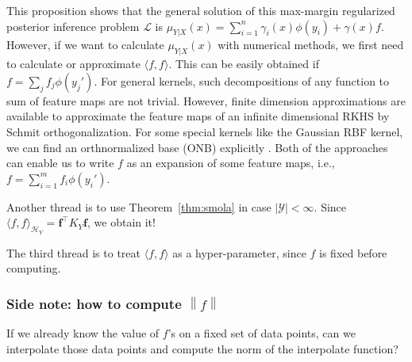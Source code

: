 \documentclass[a4paper]{article}
\renewcommand{\bf}{\mathbf}
\renewcommand{\cal}{\mathcal}
\newcommand{\norm}[1]{\left\lVert#1\right\rVert}
\newcommand{\T}{\intercal}
\newcommand{\thmref}[1]{Theorem~\ref{#1}}
\begin{document}
This proposition shows that the general solution of this max-margin regularized posterior inference problem $\cal{L}$ is $\mu_{Y|X}(x) = \sum_{i=1}^n \gamma_i(x) \phi(y_i) + \gamma(x) f$. However, if we want to calculate $\mu_{Y|X}(x)$ with numerical methods, we first need to calculate or approximate $\langle f,f \rangle$. This can be easily obtained if $f = \sum_j f_j\phi(y_j')$. For general kernels, such decompositions of any function to sum of feature maps are not trivial. However, finite dimension approximations \cite{rahimi2007random}\cite{oliva2015bayesian} are available to approximate the feature maps of an infinite dimensional RKHS by Schmit orthogonalization. For some special kernels like the Gaussian RBF kernel, we can find an orthnormalized base (ONB) explicitly \cite{steinwart2006explicit}. Both of the approaches can enable us to write $f$ as an expansion of some feature maps, i.e., $f = \sum_{i=1}^{m} f_i\phi(y_i')$.

Another thread is to use \thmref{thm:smola} in case $|\cal{Y}| < \infty$. Since $\langle f, f\rangle_{\cal{H}_Y} = \bf{f}^\T K_Y \bf{f}$, we obtain it! 

The third thread is to treat $\langle f,f\rangle$ as a hyper-parameter, since $f$ is fixed before computing.

\subsubsection{Side note: how to compute $\norm{f}$}
If we already know the value of $f$'s on a fixed set of data points, can we interpolate those data points and compute the norm of the interpolate function? 
\end{document}
